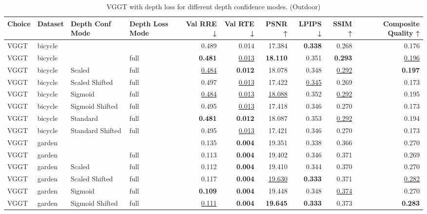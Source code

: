 \begin{table}[H]
\caption{\ifdefined\customcaption \customcaption \else VGGT with depth loss for different depth confidence modes. (Outdoor) \fi}
\label{tab:05_depth_conf_mode_outdoor}
\centering
\scriptsize
\begin{tabular}{llllrrrrrr}
\toprule
Choice & Dataset & Depth Conf Mode & Depth Loss Mode & Val RRE ↓ & Val RTE ↓ & PSNR ↑ & LPIPS ↓ & SSIM ↑ & Composite Quality ↑ \\
\midrule
VGGT & bicycle &  &  & 0.489 & 0.014 & 17.384 & \textbf{0.338} & 0.268 & 0.176 \\
VGGT & bicycle &  & full & \textbf{0.481} & \underline{0.013} & \textbf{18.110} & 0.351 & \textbf{0.293} & \underline{0.196} \\
VGGT & bicycle & Scaled & full & \underline{0.484} & \textbf{0.012} & 18.078 & 0.348 & \underline{0.292} & \textbf{0.197} \\
VGGT & bicycle & Scaled Shifted & full & 0.497 & \underline{0.013} & 17.422 & \underline{0.345} & 0.269 & 0.173 \\
VGGT & bicycle & Sigmoid & full & \underline{0.484} & \underline{0.013} & \underline{18.088} & 0.352 & \underline{0.292} & 0.195 \\
VGGT & bicycle & Sigmoid Shifted & full & 0.495 & \underline{0.013} & 17.418 & 0.346 & 0.270 & 0.173 \\
VGGT & bicycle & Standard & full & \textbf{0.481} & \textbf{0.012} & 18.087 & 0.353 & \underline{0.292} & 0.194 \\
VGGT & bicycle & Standard Shifted & full & 0.495 & \underline{0.013} & 17.421 & 0.346 & 0.270 & 0.173 \\
\midrule
VGGT & garden &  &  & 0.135 & \textbf{0.004} & 19.351 & 0.338 & 0.366 & 0.270 \\
VGGT & garden &  & full & 0.113 & \textbf{0.004} & 19.402 & 0.346 & 0.371 & 0.269 \\
VGGT & garden & Scaled & full & 0.112 & \textbf{0.004} & 19.410 & 0.344 & 0.370 & 0.270 \\
VGGT & garden & Scaled Shifted & full & 0.117 & \textbf{0.004} & \underline{19.630} & \textbf{0.333} & 0.371 & \underline{0.282} \\
VGGT & garden & Sigmoid & full & \textbf{0.109} & \textbf{0.004} & 19.448 & 0.348 & \underline{0.374} & 0.270 \\
VGGT & garden & Sigmoid Shifted & full & \underline{0.111} & \textbf{0.004} & \textbf{19.645} & \textbf{0.333} & 0.373 & \textbf{0.283} \\

\end{tabular}
\end{table}
